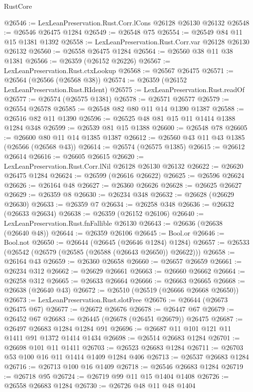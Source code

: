 \begin{lexlean}{RustCore}
\begin{coremodule}
@26546 := LexLeanPreservation.Rust.Corr.lCons @26128 @26130 @26132
@26548 := @26546 @26475 @1284
@26549 := @26548 @75
@26554 := @26549 @84 @11 @15 @1381 @1392
@26558 := LexLeanPreservation.Rust.Corr.var @26128 @26130 @26132
@26560 := @26558 @26475 @1284
@26564 := @26560 @38 @11 @38 @1381
@26566 := @26359 (@26152 @26226)
@26567 := LexLeanPreservation.Rust.ctxLookup
@26568 := @26567 @26475
@26571 := @26564 (@26566 (@26568 @38))
@26574 := @26359 (@26152 LexLeanPreservation.Rust.RIdent)
@26575 := LexLeanPreservation.Rust.readOf
@26577 := @26574 (@26575 @1381)
@26578 := @26571 @26577
@26579 := @26554 @26578
@26585 := @26548 @82 @80 @11 @14 @1390 @1387
@26588 := @26516 @82 @11 @1390
@26596 := @26525 @48 @81 @15 @11 @1414 @1388 @1284 @348
@26599 := @26539 @81 @15 @1388
@26600 := @26548 @78
@26605 := @26600 @80 @11 @14 @1385 @1387
@26612 := @26560 @43 @11 @43 @1385 (@26566 (@26568 @43))
@26614 := @26574 (@26575 @1385)
@26615 := @26612 @26614
@26616 := @26605 @26615
@26620 := LexLeanPreservation.Rust.Corr.lNil @26128 @26130 @26132
@26622 := @26620 @26475 @1284
@26624 := @26599 (@26616 @26622)
@26625 := @26596 @26624
@26626 := @26164 @48
@26627 := @26360 @26626
@26628 := @26625 @26627
@26629 := @26359 @8
@26630 := @26234 @348
@26632 := @26628 (@26629 @26630)
@26633 := @26359 @7
@26634 := @26258 @348
@26636 := @26632 (@26633 @26634)
@26638 := @26359 (@26152 @26106)
@26640 := LexLeanPreservation.Rust.fnFallible @26130
@26643 := @26636 (@26638 (@26640 @48))
@26644 := @26359 @26106
@26645 := Bool.or
@26646 := Bool.not
@26650 := @26644 (@26645 (@26646 @1284) @1284)
@26657 := @26533 (@26542 (@26579 (@26585 (@26588 (@26643 @26650)) @26622)))
@26658 := @26164 @43
@26659 := @26360 @26658
@26660 := @26657 @26659
@26661 := @26234 @312
@26662 := @26629 @26661
@26663 := @26660 @26662
@26664 := @26258 @312
@26665 := @26633 @26664
@26666 := @26663 @26665
@26668 := @26638 (@26640 @43)
@26672 := @26510 (@26519 (@26666 @26668 @26650))
@26673 := LexLeanPreservation.Rust.slotFree
@26676 := @26644 (@26673 @26475 @67)
@26677 := @26672 @26676
@26678 := @26447 @67
@26679 := @26452 @67
@26683 := @26445 (@26678 (@26451 @26679)) @26475
@26687 := @26497 @26683 @1284 @1284 @91
@26696 := @26687 @11 @101 @121 @11 @1411 @91 @1372 @1414 @1434
@26698 := @26514 @26683 @1284
@26701 := @26698 @101 @11 @1411
@26703 := @26523 @26683 @1284
@26711 := @26703 @53 @100 @16 @11 @1414 @1409 @1284 @406
@26713 := @26537 @26683 @1284
@26716 := @26713 @100 @16 @1409
@26718 := @26546 @26683 @1284
@26719 := @26718 @95
@26724 := @26719 @99 @11 @15 @1404 @1408
@26726 := @26558 @26683 @1284
@26730 := @26726 @48 @11 @48 @1404

\end{coremodule}
\end{lexlean}
